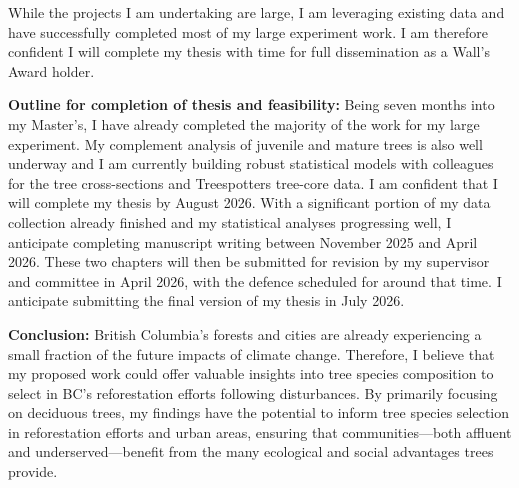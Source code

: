 \documentclass[11pt,letter]{article}
\begin{document}
While the projects I am undertaking are large, I am leveraging existing data and have successfully completed most of my large experiment work. I am therefore confident I will complete my thesis with time for full dissemination as a Wall's Award holder. 
\par
\textbf{Outline for completion of thesis and feasibility:} Being seven months into my Master’s, I have already completed the majority of the work for my large experiment. My complement analysis of juvenile and mature trees is also well underway and I am currently building robust statistical models with colleagues for the tree cross-sections and Treespotters tree-core data. 
I am confident that I will complete my thesis by August 2026. With a significant portion of my data collection already finished and my statistical analyses progressing well, I anticipate completing manuscript writing between November 2025 and April 2026. These two chapters will then be submitted for revision by my supervisor and committee in April 2026, with the defence scheduled for around that time. I anticipate submitting the final version of my thesis in July 2026.

\textbf{Conclusion:} British Columbia’s forests and cities are already experiencing a small fraction of the future impacts of climate change. Therefore, I believe that my proposed work could offer valuable insights into tree species composition to select in BC's reforestation efforts following disturbances. By primarily focusing on deciduous trees, my findings have the potential to inform tree species selection in reforestation efforts and urban areas, ensuring that communities—both affluent and underserved—benefit from the many ecological and social advantages trees provide.

\end{document}
